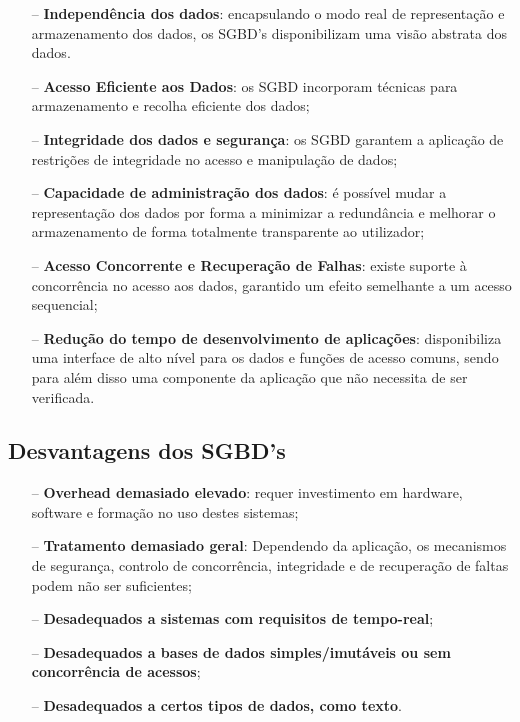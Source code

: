 \documentclass[titlepage]{book}
\theoremstyle{definition}
\begin{document}
\begin{itemize}
    \itemsep0cm
    \item[--]\textbf{Independência dos dados}: encapsulando o modo real de representação e armazenamento dos dados, os SGBD's disponibilizam uma visão abstrata dos dados.
    \item[--]\textbf{Acesso Eficiente aos Dados}: os SGBD incorporam técnicas para armazenamento e recolha eficiente dos dados;
    \item[--]\textbf{Integridade dos dados e segurança}: os SGBD garantem a aplicação de restrições de integridade no acesso e manipulação de dados;
    \item[--]\textbf{Capacidade de administração dos dados}: é possível mudar a representação dos dados por forma a minimizar a redundância e melhorar o armazenamento de forma totalmente transparente ao utilizador;
    \item[--]\textbf{Acesso Concorrente e Recuperação de Falhas}: existe suporte à concorrência no acesso aos dados, garantido um efeito semelhante a um acesso sequencial;
    \item[--]\textbf{Redução do tempo de desenvolvimento de aplicações}: disponibiliza uma interface de alto nível para os dados e funções de acesso comuns, sendo para além disso uma componente da aplicação que não necessita de ser verificada.  
\end{itemize}

\subsection{Desvantagens dos SGBD's}

\begin{itemize}
    \itemsep0cm
    \item[--]\textbf{Overhead demasiado elevado}: requer investimento em hardware, software e formação no uso destes sistemas;
    \item[--]\textbf{Tratamento demasiado geral}: Dependendo da aplicação, os mecanismos de segurança, controlo de concorrência, integridade e de recuperação de faltas podem não ser suficientes;
    \item[--]\textbf{Desadequados a sistemas com requisitos de tempo-real};
    \item[--]\textbf{Desadequados a bases de dados simples/imutáveis ou sem concorrência de acessos};
    \item[--]\textbf{Desadequados a certos tipos de dados, como texto}.   
\end{itemize}
\end{document}
